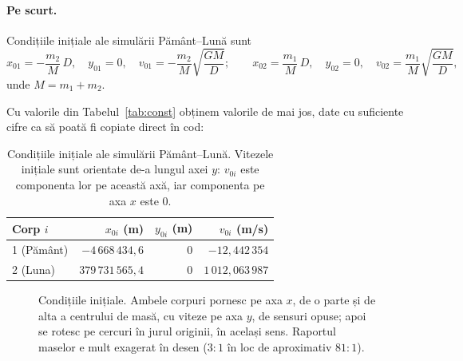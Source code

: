 \documentclass[11pt,a4paper]{article}
\begin{document}
\paragraph{Pe scurt.} Condițiile inițiale ale simulării Pământ--Lună sunt
\[
  x_{01} = -\frac{m_2}{M}\,D, \quad y_{01} = 0, \quad v_{01} = -\frac{m_2}{M}\sqrt{\frac{GM}{D}};
  \qquad
  x_{02} = \frac{m_1}{M}\,D, \quad y_{02} = 0, \quad v_{02} = \frac{m_1}{M}\sqrt{\frac{GM}{D}},
\]
unde $M = m_1 + m_2$.

Cu valorile din Tabelul~\ref{tab:const} obținem valorile de mai jos, date cu suficiente cifre ca să poată fi copiate direct în cod:

\begin{table}[H]
\centering
\begin{tabular}{@{}lrrr@{}}
\toprule
Corp $i$ & $x_{0i}$ (m) & $y_{0i}$ (m) & $v_{0i}$ (m/s) \\
\midrule
1 (Pământ) & $-4\,668\,434{,}6$ & $0$ & $-12{,}442\,354$ \\
2 (Luna)   & $379\,731\,565{,}4$ & $0$ & $1\,012{,}063\,987$ \\
\bottomrule
\end{tabular}
\caption{Condițiile inițiale ale simulării Pământ--Lună. Vitezele inițiale sunt orientate de-a lungul axei $y$: $v_{0i}$ este componenta lor pe această axă, iar componenta pe axa $x$ este $0$.}
\label{tab:ci}
\end{table}

\begin{figure}[H]
\centering
{}
\caption{Condițiile inițiale. Ambele corpuri pornesc pe axa $x$, de o parte și de alta a centrului de masă, cu viteze pe axa $y$, de sensuri opuse; apoi se rotesc pe cercuri în jurul originii, în același sens. Raportul maselor e mult exagerat în desen ($3{:}1$ în loc de aproximativ $81{:}1$).}
\label{fig:ci}
\end{figure}
\end{document}
